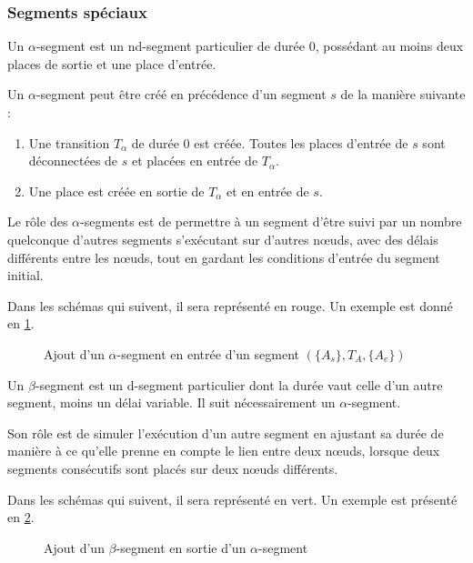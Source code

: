 \subsubsection{Segments spéciaux}
\label{section.alphasegment}
\begin{mydef}
Un $\alpha$-segment est un nd-segment particulier de durée $0$, possédant au moins deux places de sortie et une place d'entrée.
\end{mydef}
Un $\alpha$-segment peut être créé en précédence d'un segment $s$ de la manière suivante : 
\begin{enumerate}
\item Une transition $T_\alpha$ de durée 0 est créée. Toutes les places d'entrée de $s$ sont déconnectées de $s$ et placées en entrée de $T_\alpha$.
\item Une place est créée en sortie de $T_\alpha$ et en entrée de $s$. 
\end{enumerate}

Le rôle des $\alpha$-segments est de permettre à un segment d'être suivi par un nombre quelconque d'autres segments s'exécutant sur d'autres nœuds, avec des délais différents entre les nœuds, tout en gardant les conditions d'entrée du segment initial.

Dans les schémas qui suivent, il sera représenté en \textcolor{BrickRed}{rouge}. Un exemple est donné en \cref{fig.alphaSegment}.

\begin{figure}[H]
	\centering
	
	\caption{Ajout d'un $\alpha$-segment en entrée d'un segment $(\lbrace A_s \rbrace, T_A, \lbrace A_e \rbrace)$}
	\label{fig.alphaSegment}
\end{figure}

\begin{mydef}
Un $\beta$-segment est un d-segment particulier dont la durée vaut celle d'un autre segment, moins un délai variable. Il suit nécessairement un $\alpha$-segment.

\end{mydef}
Son rôle est de simuler l'exécution d'un autre segment en ajustant sa durée de manière à ce qu'elle prenne en compte le lien entre deux nœuds, lorsque deux segments consécutifs sont placés sur deux nœuds différents.

Dans les schémas qui suivent, il sera représenté en \textcolor{OliveGreen}{vert}. Un exemple est présenté en \cref{fig.betaSegment}.

\begin{figure}[H]
	\centering
	
	\caption{Ajout d'un $\beta$-segment en sortie d'un $\alpha$-segment}
	\label{fig.betaSegment}
\end{figure}


